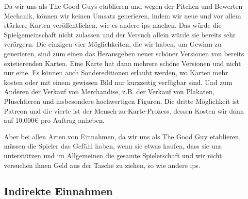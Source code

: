 \documentclass[fontsize=12, a4aper]{scrartcl}
\begin{document}
\noindent Da wir uns als \glqq The Good Guys\grqq{} etablieren und wegen der Pitchen-und-Bewerten Mechanik, können wir keinen Umsatz generieren, indem wir neue und vor allem stärkere Karten veröffentlichen, wie es andere \acp{ip} machen. Das würde die Spielgemeinschaft nicht zulassen und der Versuch allein würde sie bereits sehr verärgern. Die einzigen vier Möglichkeiten, die wir haben, um Gewinn zu generieren, sind zum einen das Herausgeben neuer schöner Versionen von bereits existierenden Karten. Eine Karte hat dann mehrere schöne Versionen und nicht nur eine. Es können auch Sondereditionen erlaubt werden, wo Karten mehr kosten oder mit einem gewissen Bild nur kurzzeitig verfügbar sind. Und zum Anderen der Verkauf von Merchandise, z.B. der Verkauf von Plakaten, Plüschtieren und insbesondere hochwertigen Figuren. Die dritte Möglichkeit ist Patreon und die vierte ist der \glqq Mensch-zu-Karte-Prozess\grqq, dessen Kosten wir dann auf 10.000€ pro Auftrag anheben.\hfill\newline

\noindent Aber bei allen Arten von Einnahmen, da wir uns als \glqq The Good Guy\grqq{} etablieren, müssen die Spieler das Gefühl haben, wenn sie etwas kaufen, dass sie uns unterstützen und im Allgemeinen die gesamte Spielerschaft und wir nicht versuchen ihnen Geld aus der Tasche zu ziehen, so wie andere \acp{ip}. 

\subsection{Indirekte Einnahmen} \label{subsec:Indirekte_Einnahmen}
\end{document}

